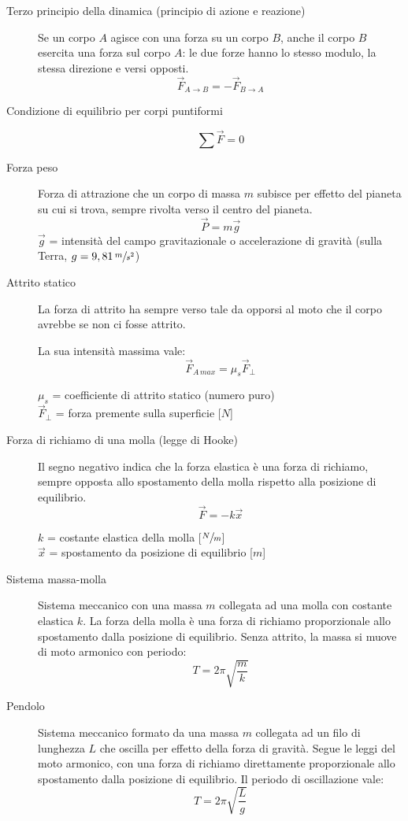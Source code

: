 \documentclass[a4paper,11pt,italian]{article}
\begin{document}
\begin{description}
  \item[Terzo principio della dinamica (principio di azione e reazione)] 
  Se un corpo $ A $ agisce con una forza su un corpo $ B $, anche il corpo $ B $ esercita una forza sul corpo $ A $: le due forze hanno lo stesso modulo, la stessa direzione e versi opposti.
  \[ \vec{F}_{A \rightarrow B} = - \vec{F}_{B \rightarrow A}\]
  
  \item[Condizione di equilibrio per corpi puntiformi]
  \[ \sum\vec{F} = 0 \]
  
  \item[Forza peso] 
  Forza di attrazione che un corpo di massa $ m $ subisce per effetto del pianeta su cui si trova, sempre rivolta verso il centro del pianeta.
  \[ \vec{P} = m \vec{g} \]
  $ \vec{g} $ = intensità del campo gravitazionale o accelerazione di gravità (sulla Terra, $ g=9,81 \, \sfrac{m}{s^2} $)
  
  \item[Attrito statico] 
  La forza di attrito ha sempre verso tale da opporsi al moto che il corpo avrebbe se non ci fosse attrito.
  
  La sua intensità massima vale:
  \[ \vec{F}_{A \, max} = \mu_s \vec{F}_\perp  \]
  \begin{multicols}{2}
  $ \mu_s $ = coefficiente di attrito statico (numero puro)\\
  $ \vec{F}_\perp $ = forza premente sulla superficie [$ N $]
  \end{multicols}
  
  \item[Forza di richiamo di una molla (legge di Hooke)]
  Il segno negativo indica che la forza elastica è una forza di richiamo, sempre opposta allo spostamento della molla rispetto alla posizione di equilibrio.
  \[ \vec{F} = - k \vec{x} \]
  \begin{multicols}{2}
  $ k $ = costante elastica della molla [$ \sfrac{N}{m} $]\\
  $ \vec{x} $ = spostamento da posizione di equilibrio [$ m $]
  \end{multicols}
  
  \item[Sistema massa-molla] 
  Sistema meccanico con una massa $ m $ collegata ad una molla con costante elastica $ k $. La forza della molla è una forza di richiamo proporzionale allo spostamento dalla posizione di equilibrio. Senza attrito, la massa si muove di moto armonico con periodo:
  \[ T = 2\pi\sqrt{\frac{m}{k}} \]
  
  \item[Pendolo] 
  Sistema meccanico formato da una massa $ m $ collegata ad un filo di lunghezza $ L $ che oscilla per effetto della forza di gravità. Segue le leggi del moto armonico, con una forza di richiamo direttamente proporzionale allo spostamento dalla posizione di equilibrio. Il periodo di oscillazione vale:
  \[ T = 2\pi\sqrt{\frac{L}{g}} \]
\end{description}
\end{document}
